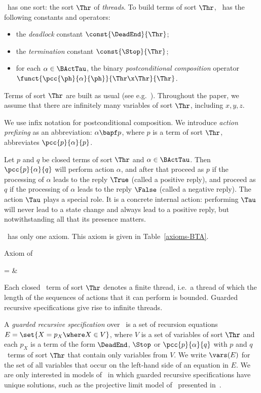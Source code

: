 \documentclass[fleqn]{llncs}
\begin{document}
\BTA\ has one sort: the sort $\Thr$ of \emph{threads}.
To build terms of sort $\Thr$, \BTA\ has the following constants and
operators:
\begin{itemize}
\item
the \emph{deadlock} constant $\const{\DeadEnd}{\Thr}$;
\item
the \emph{termination} constant $\const{\Stop}{\Thr}$;
\item
for each $\alpha \in \BActTau$,
the binary \emph{postconditional composition} operator
$\funct{\pcc{\ph}{\alpha}{\ph}}{\Thr \x \Thr}{\Thr}$.
\end{itemize}
Terms of sort $\Thr$ are built as usual (see e.g.~\cite{Wir90a,ST99a}).
Throughout the paper, we assume that there are infinitely many variables
of sort $\Thr$, including $x,y,z$.

We use infix notation for postconditional composition.
We introduce \emph{action prefixing} as an abbreviation:
$\alpha \bapf p$, where $p$ is a term of sort $\Thr$, abbreviates
$\pcc{p}{\alpha}{p}$.

Let $p$ and $q$ be closed terms of sort $\Thr$ and
$\alpha \in \BActTau$.
Then $\pcc{p}{\alpha}{q}$ will perform action $\alpha$, and after that
proceed as $p$ if the processing of $\alpha$ leads to the reply $\True$
(called a positive reply), and proceed as $q$ if the processing of
$\alpha$ leads to the reply $\False$ (called a negative reply).
The action $\Tau$ plays a special role.
It is a concrete internal action: performing $\Tau$ will never lead to a
state change and always lead to a positive reply, but notwithstanding
all that its presence matters.

\BTA\ has only one axiom.
This axiom is given in Table~\ref{axioms-BTA}.\begin{table}[!t]
\caption{Axiom of \BTA}
\label{axioms-BTA}
\begin{eqntbl}
\begin{axcol}
 =                       & 
\end{axcol}
\end{eqntbl}
\end{table}

Each closed \BTA\ term of sort $\Thr$ denotes a finite thread, i.e.\ a
thread of which the length of the sequences of actions that it can
perform is bounded.
Guarded recursive specifications give rise to infinite threads.

A \emph{guarded recursive specification} over \BTA\ is a set of
recursion equations $E = \set{X = p_X \where X \in V}$, where $V$ is a
set of variables of sort $\Thr$ and each $p_X$ is a term of the form
$\DeadEnd$, $\Stop$ or $\pcc{p}{\alpha}{q}$ with $p$ and $q$ \BTA\ terms
of sort $\Thr$ that contain only variables from $V$.
We write $\vars(E)$ for the set of all variables that occur on the
left-hand side of an equation in $E$.
We are only interested in models of \BTA\ in which guarded recursive
specifications have unique solutions, such as the projective limit model
of \BTA\ presented in~\cite{BB03a}.
\end{document}
